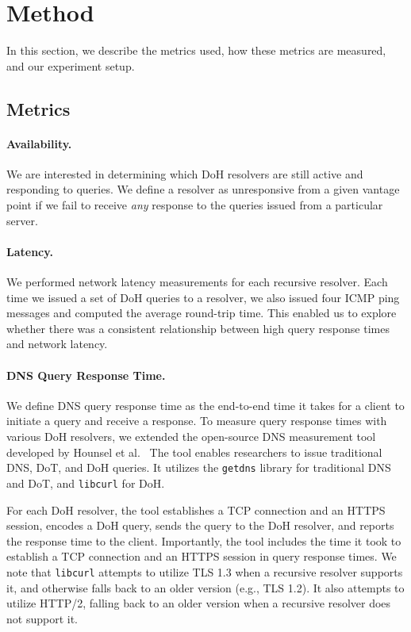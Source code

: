 \section{Method}\label{sec:method} In this section, we describe the metrics
used, how these metrics are measured, and our experiment setup.

\subsection{Metrics} 

\paragraph{Availability.} We are interested in determining which DoH
resolvers are still active and responding to queries.  We define a resolver as
unresponsive from a given vantage point if we fail to receive \emph{any}
response to the queries issued from a particular server.

\paragraph{Latency.} We
performed network latency measurements for each recursive resolver.  Each time
we issued a set of DoH queries to a resolver, we also issued four ICMP ping
messages and computed the average round-trip time.  This enabled us to explore
whether there was a consistent relationship between high query response times
and network latency.


\paragraph{DNS Query Response Time.} We define DNS query response time as the
end-to-end time it takes for a client to initiate a query and receive a
response.  To measure query response times with various DoH resolvers, we
extended the open-source DNS measurement tool developed by Hounsel et
al.~\cite{hounsel2020comparing} The tool enables researchers to issue
traditional DNS, DoT, and DoH queries.  It utilizes the \texttt{getdns}
library for traditional DNS and DoT, and \texttt{libcurl} for DoH.

For each DoH resolver, the tool establishes a TCP connection and an HTTPS session,
encodes a DoH query, sends the query to the DoH resolver, and reports the
response time to the client.  Importantly, the tool includes the time it took
to establish a TCP connection and an HTTPS session in query response times.
We note that \texttt{libcurl} attempts to utilize TLS 1.3 when a recursive
resolver supports it, and otherwise falls back to an older version
(e.g., TLS 1.2).
It also attempts to utilize HTTP/2, falling back to an older version when a
recursive resolver does not support it.

